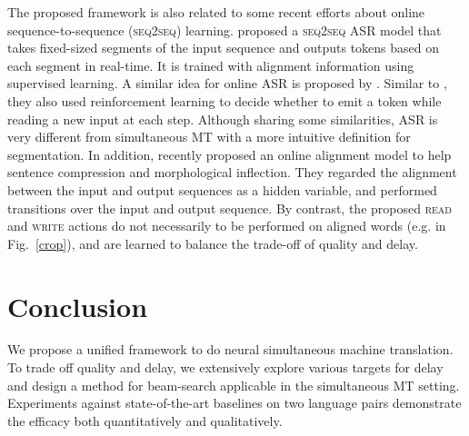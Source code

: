 The proposed framework is also related to some recent efforts about online sequence-to-sequence (\textsc{seq2seq}) learning. 
\citep{jaitly2015online} proposed a \textsc{seq2seq} ASR model that takes fixed-sized segments of the input sequence and outputs tokens based on each segment in real-time. It is trained with alignment information using supervised learning. A similar idea for online ASR is proposed by \citep{luo2016learning}. Similar to \citep{satija2016simultaneous}, they also used reinforcement learning to decide whether to emit a token while reading a new input at each step. Although sharing some similarities, ASR is very different from simultaneous MT with a more intuitive definition for segmentation. 
In addition, \citep{yu2016online} recently proposed an online alignment model to help sentence compression and morphological inflection. They regarded the alignment between the input and output sequences as a hidden variable, and performed transitions over the input and output sequence. By contrast, the proposed \textsc{read} and \textsc{write} actions do not necessarily to be performed on aligned words (e.g. in Fig.~\ref{crop}), and are learned to balance the trade-off of quality and delay.

\section{Conclusion}
We propose a unified framework to do neural simultaneous machine translation. 
To trade off quality and delay, we extensively explore various targets for delay and design a method for beam-search applicable in the simultaneous MT setting.
Experiments against state-of-the-art baselines on two language pairs demonstrate the efficacy both quantitatively and qualitatively.

